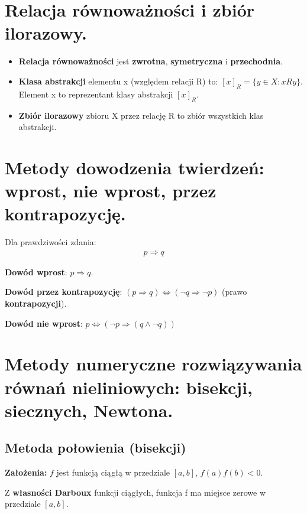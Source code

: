 \documentclass[main.tex]{subfiles}
\begin{document}
    \section{Relacja równoważności i zbiór ilorazowy.}

    \begin{itemize}
        \item \textbf{Relacja równoważności} jest \textbf{zwrotna}, \textbf{symetryczna} i \textbf{przechodnia}.

        \item \textbf{Klasa abstrakcji} elementu x (względem relacji R) to: $[x]_{R} = \{y \in X: xRy\}$. Element x to
        reprezentant klasy abstrakcji $[x]_{R}$.

        \item \textbf{Zbiór ilorazowy} zbioru X przez relację R to zbiór wszystkich klas abstrakcji.
    \end{itemize}


    \section{Metody dowodzenia twierdzeń: wprost, nie wprost, przez kontrapozycję.}

    Dla prawdziwości zdania:
    \begin{align*}
        p \Rightarrow q
    \end{align*}

    \textbf{Dowód wprost}: $ p \Rightarrow q$.

    \textbf{Dowód przez kontrapozycję}: $(p \Rightarrow q) \Leftrightarrow (\neg q \Rightarrow \neg p)$ (prawo \textbf{kontrapozycji}).

    \textbf{Dowód nie wprost}: $p \Leftrightarrow (\neg p \Rightarrow (q \wedge \neg q))$


    \section{Metody numeryczne rozwiązywania równań nieliniowych: bisekcji, siecznych, Newtona.}

    \subsection{Metoda połowienia (bisekcji)}

    \textbf{Założenia:} $f$ jest funkcją ciągłą w przedziale $[a,b]$, $f(a)f(b) < 0$.

    \noindent Z \textbf{własności Darboux} funkcji ciągłych, funkcja f ma miejsce zerowe w przedziale $[a,b]$.
\end{document}
